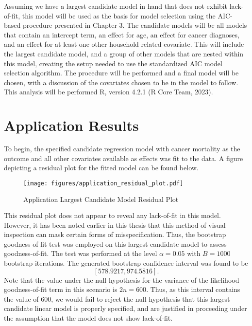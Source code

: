 		Assuming we have a largest candidate model in hand that does not exhibit lack-of-fit, this model will be used as the basis for model selection using the
		AIC-based procedure presented in Chapter 3. The candidate models will be all models that contain an intercept term, an effect for age, an effect for cancer
		diagnoses, and an effect for at least one other household-related covariate. This will include the largest candidate model, and a group of other models that
		are nested within this model, creating the setup needed to use the standardized AIC model selection algorithm. The procedure will be performed and a final model
		will be chosen, with a discussion of the covariates chosen to be in the model to follow. This analysis will be performed R, version 4.2.1 (R Core Team, 2023).
		
		\section{Application Results} \label{sec:app_res}

		To begin, the specified candidate regression model with cancer mortality as the outcome and all other covariates available as effects was fit to the data. A
		figure depicting a residual plot for the fitted model can be found below.

		\begin{figure}[H]
			\centering
			\captionsetup{justification=centering}
			\texttt{[image: figures/application\_residual\_plot.pdf]}
			\caption{\label{fig:app_residual_plot} Application Largest Candidate Model Residual Plot}
		\end{figure}

		This residual plot does not appear to reveal any lack-of-fit in this model. However, it has been noted earlier in this thesis that this method of visual
		inspection can mask certain forms of misspecification. Thus, the bootstrap goodness-of-fit test was employed on this largest candidate model to assess
		goodness-of-fit. The test was performed at the level $\alpha = 0.05$ with $B = 1000$ bootstrap iterations. The generated bootstrap confidence interval
		was found to be
		\begin{equation*}
			\left[ 578.9217, 974.5816 \right].
		\end{equation*}
		Note that the value under the null hypothesis for the variance of the likelihood goodness-of-fit term in this scenario is $2n = 600$. Thus, as this interval contains the
		value of $600$, we would fail to reject the null hypothesis that this largest candidate linear model is properly specified, and are justified in proceeding
		under the assumption that the model does not show lack-of-fit.

